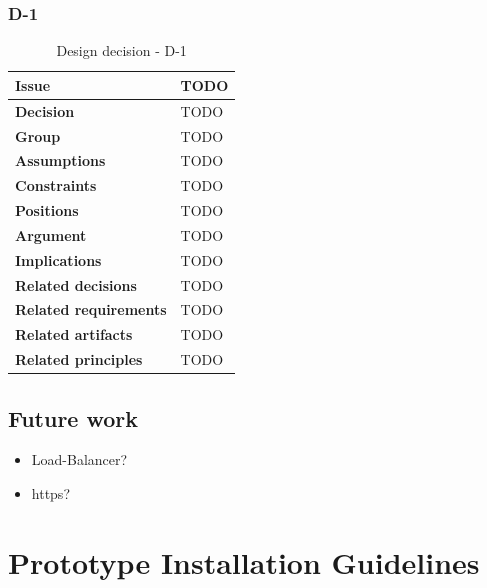 \documentclass[11pt]{article}
\begin{document}
\newpage

\subsubsection{D-1}

\begin{table}[h] \small
	\begin{tabularx}{\textwidth}{ | l | X |}
    	\hline
	\cellcolor[gray]{0.9}
    	\textbf{Issue} & TODO \\
	\hline
	\cellcolor[gray]{0.9}
	\textbf{Decision} & TODO \\
	\hline
	\cellcolor[gray]{0.9}
	\textbf{Group} & TODO \\
	\hline
	\cellcolor[gray]{0.9}
	\textbf{Assumptions} & TODO \\
	\hline
	\cellcolor[gray]{0.9}
	\textbf{Constraints} & TODO \\
	\hline
	\cellcolor[gray]{0.9}
	\textbf{Positions} & TODO \\
	\hline
	\cellcolor[gray]{0.9}
	\textbf{Argument} & TODO \\
	\hline
	\cellcolor[gray]{0.9}
	\textbf{Implications} & TODO \\
	\hline
	\cellcolor[gray]{0.9}
	\textbf{Related decisions} & TODO \\
	\hline
	\cellcolor[gray]{0.9}
	\textbf{Related requirements} & TODO\\
	\hline
	\cellcolor[gray]{0.9}
	\textbf{Related artifacts} & TODO\\
	\hline
	\cellcolor[gray]{0.9}
	\textbf{Related principles} & TODO\\
	\hline
	\end{tabularx}
	\caption{Design decision - D-1}
	\label{dec:D1}
\end{table}

\subsection{Future work}

\begin{itemize}
\item Load-Balancer?
\item https?
\end{itemize}

\section{Prototype Installation Guidelines}
\end{document}
